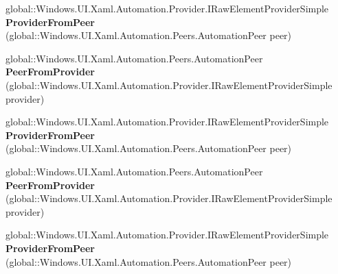 \begin{DoxyCompactItemize}
global\+::\+Windows.\+U\+I.\+Xaml.\+Automation.\+Provider.\+I\+Raw\+Element\+Provider\+Simple {\bfseries Provider\+From\+Peer} (global\+::\+Windows.\+U\+I.\+Xaml.\+Automation.\+Peers.\+Automation\+Peer peer)
\item 
\mbox{\label{interface_windows_1_1_u_i_1_1_xaml_1_1_automation_1_1_peers_1_1_i_automation_peer_protected_a3cb5a538589736fee87b4e8736427c44}} 
global\+::\+Windows.\+U\+I.\+Xaml.\+Automation.\+Peers.\+Automation\+Peer {\bfseries Peer\+From\+Provider} (global\+::\+Windows.\+U\+I.\+Xaml.\+Automation.\+Provider.\+I\+Raw\+Element\+Provider\+Simple provider)
\item 
\mbox{\label{interface_windows_1_1_u_i_1_1_xaml_1_1_automation_1_1_peers_1_1_i_automation_peer_protected_a8d0f0c10723d5bd0c3717eb4b4179694}} 
global\+::\+Windows.\+U\+I.\+Xaml.\+Automation.\+Provider.\+I\+Raw\+Element\+Provider\+Simple {\bfseries Provider\+From\+Peer} (global\+::\+Windows.\+U\+I.\+Xaml.\+Automation.\+Peers.\+Automation\+Peer peer)
\item 
\mbox{\label{interface_windows_1_1_u_i_1_1_xaml_1_1_automation_1_1_peers_1_1_i_automation_peer_protected_a3cb5a538589736fee87b4e8736427c44}} 
global\+::\+Windows.\+U\+I.\+Xaml.\+Automation.\+Peers.\+Automation\+Peer {\bfseries Peer\+From\+Provider} (global\+::\+Windows.\+U\+I.\+Xaml.\+Automation.\+Provider.\+I\+Raw\+Element\+Provider\+Simple provider)
\item 
\mbox{\label{interface_windows_1_1_u_i_1_1_xaml_1_1_automation_1_1_peers_1_1_i_automation_peer_protected_a8d0f0c10723d5bd0c3717eb4b4179694}} 
global\+::\+Windows.\+U\+I.\+Xaml.\+Automation.\+Provider.\+I\+Raw\+Element\+Provider\+Simple {\bfseries Provider\+From\+Peer} (global\+::\+Windows.\+U\+I.\+Xaml.\+Automation.\+Peers.\+Automation\+Peer peer)
\item 
\mbox{\label{interface_windows_1_1_u_i_1_1_xaml_1_1_automation_1_1_peers_1_1_i_automation_peer_protected_a3cb5a538589736fee87b4e8736427c44}} 

\end{DoxyCompactItemize}

